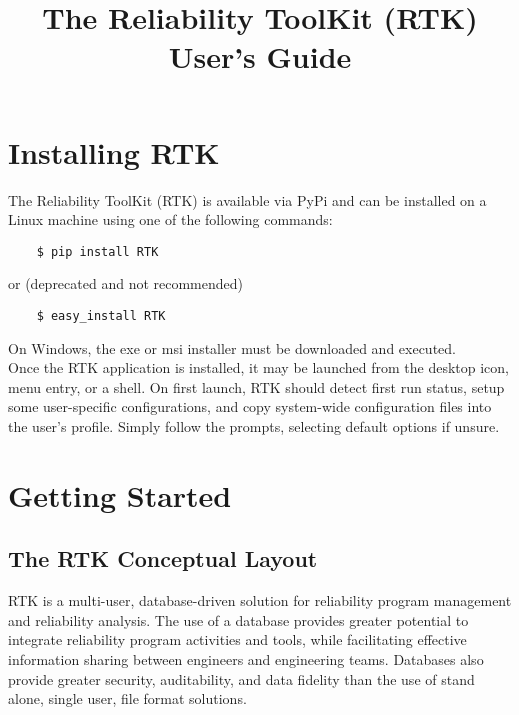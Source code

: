 \documentclass[twoside,12pt,letterpaper,openright]{book}
\begin{document}
\title{The Reliability ToolKit (RTK) User's Guide}

\chapter{Installing RTK}

\noindent The Reliability ToolKit (RTK) is available via PyPi and can be 
installed on a Linux machine using one of the following commands:

\begin{lstlisting}
    $ pip install RTK
\end{lstlisting}

\noindent or (deprecated and not recommended)

\begin{lstlisting}
    $ easy_install RTK
\end{lstlisting}

\noindent On Windows, the exe or msi installer must be downloaded and executed.
\\

\noindent Once the RTK application is installed, it may be launched from the 
desktop icon, menu entry, or a shell.  On first launch, RTK should detect first 
run status, setup some user-specific configurations, and copy system-wide 
configuration files into the user's profile.  Simply follow the prompts, 
selecting default options if unsure.

\chapter{Getting Started}

\section{The RTK Conceptual Layout}

\noindent RTK is a multi-user, database-driven solution for reliability 
program management and reliability analysis.  The use of a database provides 
greater potential to integrate reliability program activities and tools, while 
facilitating effective information sharing between engineers and engineering
teams.  Databases also provide greater security, auditability, and data 
fidelity than the use of stand alone, single user, file format solutions.
\\
\end{document}
